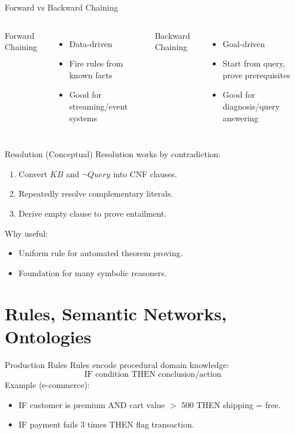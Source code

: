 \documentclass[10pt]{beamer}
\begin{document}
\begin{frame}{Forward vs Backward Chaining}
    \begin{columns}[T,onlytextwidth]
        \alert{Forward Chaining}
        \begin{itemize}
            \item Data-driven
            \item Fire rules from known facts
            \item Good for streaming/event systems
        \end{itemize}

        \alert{Backward Chaining}
        \begin{itemize}
            \item Goal-driven
            \item Start from query, prove prerequisites
            \item Good for diagnosis/query answering
        \end{itemize}
    \end{columns}
\end{frame}

\begin{frame}{Resolution (Conceptual)}
    Resolution works by contradiction:
    \begin{enumerate}
        \item Convert $KB$ and $\neg Query$ into CNF clauses.
        \item Repeatedly resolve complementary literals.
        \item Derive empty clause to prove entailment.
    \end{enumerate}
    \vspace{0.2cm}
    Why useful:
    \begin{itemize}
        \item Uniform rule for automated theorem proving.
        \item Foundation for many symbolic reasoners.
    \end{itemize}
\end{frame}

\section{Rules, Semantic Networks, Ontologies}

\begin{frame}{Production Rules}
    Rules encode procedural domain knowledge:
    \[
      \text{IF condition THEN conclusion/action}
    \]
    \vspace{0.2cm}
    Example (e-commerce):
    \begin{itemize}
        \item IF customer is premium AND cart value $>$ 500 THEN shipping = free.
        \item IF payment fails 3 times THEN flag transaction.
    \end{itemize}
\end{frame}
\end{document}
